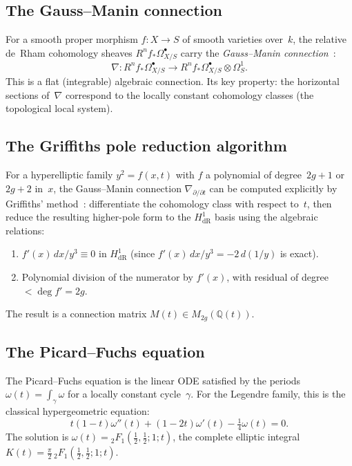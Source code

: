 \documentclass[11pt]{article}
\theoremstyle{plain}
\theoremstyle{definition}
\theoremstyle{remark}
\newcommand{\Q}{\mathbb{Q}}
\newcommand{\HdR}{H^1_{\mathrm{dR}}}
\begin{document}
\subsection{The Gauss--Manin connection}\label{ssec:gm}

For a smooth proper morphism $f : X \to S$ of smooth varieties
over~$k$, the relative de~Rham cohomology sheaves
$R^n f_* \Omega^\bullet_{X/S}$ carry the \emph{Gauss--Manin
connection}~\cite{KatzOda1968,Katz1970}:
\[
  \nabla : R^n f_* \Omega^\bullet_{X/S}
  \to R^n f_* \Omega^\bullet_{X/S} \otimes \Omega^1_S.
\]
This is a flat (integrable) algebraic connection.  Its key
property: the horizontal sections of~$\nabla$ correspond to
the locally constant cohomology classes (the topological
local system).

\subsection{The Griffiths pole reduction algorithm}\label{ssec:griffiths}

For a hyperelliptic family $y^2 = f(x, t)$ with $f$ a polynomial
of degree~$2g+1$ or~$2g+2$ in~$x$, the Gauss--Manin connection
$\nabla_{\partial/\partial t}$ can be computed explicitly by
Griffiths' method~\cite{Griffiths1969}: differentiate the
cohomology class with respect to~$t$, then reduce the resulting
higher-pole form to the $\HdR$ basis using the algebraic relations:
\begin{enumerate}[nosep]
\item $f'(x)\,dx/y^3 \equiv 0$ in $\HdR$ (since
  $f'(x)\,dx/y^3 = -2\,d(1/y)$ is exact).
\item Polynomial division of the numerator by $f'(x)$, with
  residual of degree $< \deg f' = 2g$.
\end{enumerate}
The result is a connection matrix $M(t) \in M_{2g}(\Q(t))$.

\subsection{The Picard--Fuchs equation}\label{ssec:pf}

The Picard--Fuchs equation is the linear ODE satisfied by the
periods $\omega(t) = \int_\gamma \omega$ for a locally constant
cycle~$\gamma$.  For the Legendre family, this is the classical
hypergeometric equation:
\[
  t(1-t)\omega''(t) + (1-2t)\omega'(t) - \tfrac{1}{4}\omega(t) = 0.
\]
The solution is $\omega(t) = {}_2F_1(\tfrac{1}{2}, \tfrac{1}{2}; 1; t)$,
the complete elliptic integral $K(t) = \frac{\pi}{2}\,{}_2F_1(\tfrac{1}{2},
\tfrac{1}{2}; 1; t)$.
\end{document}
